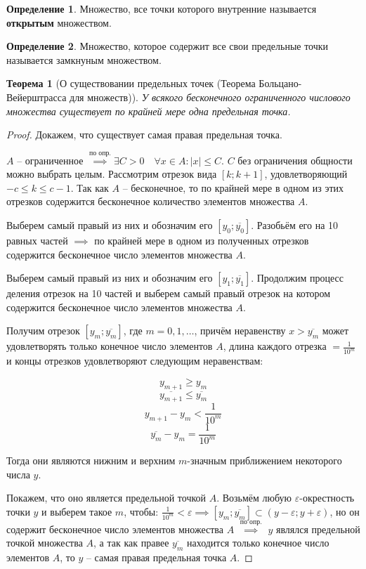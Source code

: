 \documentclass[a4paper,oneside]{article}
\newcommand{\bydef}{\stackrel{\text{по опр.}}{\implies}} %
\newtheorem{theorem}{Теорема}[subsection]
\theoremstyle{definition}
\newtheorem{definition}{Определение}[subsection]
\theoremstyle{definition}
\theoremstyle{definition}
\begin{document}
\begin{definition}
    Множество, все точки которого внутренние называется \textbf{открытым} множеством.    
\end{definition}

\begin{definition}
    Множество, которое содержит все свои предельные точки называется замкнуным множеством.    
\end{definition}

\begin{theorem}[О существовании предельных точек (Теорема Больцано-Вейерштрасса для множеств)]
    У всякого бесконечного ограниченного числового множества существует по крайней мере
    одна предельная точка.    
\end{theorem}

\begin{proof}
    Докажем, что существует самая правая предельная точка.

    $A$ -- ограниченное $\bydef \exists C > 0 \quad
    \forall x \in A: |x| \le C$.
    $C$ без ограничения общности можно выбрать целым.
    Рассмотрим отрезок вида $[k;k+1]$, удовлетворяющий $-c \le k \le c - 1$.
    Так как $A$ -- бесконечное, то по крайней мере в одном из этих отрезков содержится
    бесконечное количество элементов множества $A$.
    
    Выберем самый правый из них и обозначим его $[y_0;\overline{y_0}]$.
    Разобьём его на 10 равных частей $\implies$ по крайней мере в одном из
    полученных отрезков содержится бесконечное число элементов множества $A$.
    
    Выберем самый правый из них и обозначим его $[y_1;\overline{y_1}]$.
    Продолжим процесс деления отрезок на 10 частей и выберем самый правый отрезок
    на котором содержится бесконечное число элементов множества $A$.
    
    Получим отрезок $[y_m;\overline{y_m}]$, где $m = 0,1,\dots$, причём неравенству
    $x > \overline{y_m}$ может удовлетворять только конечное число элементов $A$,
    длина каждого отрезка $= \frac{1}{10^m}$ и концы отрезков удовлетворяют
    следующим неравенствам:
    
    \[y_{m+1} \ge y_m\]
    \[\overline{y_{m+1}} \le \overline{y_m}\]
    \[y_{m+1} - y_m < \frac{1}{10^m}\]
    \[\overline{y_m} - y_m = \frac{1}{10^m}\]
    
    Тогда они являются нижним и верхним $m$-значным приближением некоторого числа $y$.
    
    Покажем, что оно является предельной точкой $A$. Возьмём любую $\varepsilon$-окрестность
    точки $y$ и выберем такое $m$, чтобы: 
    $\frac{1}{10^m} < \varepsilon \implies [y_m;\overline{y_m}] \subset 
    (y - \varepsilon; y + \varepsilon)$, но он содержит бесконечное число элементов
    множества $A$ $\bydef$ $y$ являлся предельной точкой
    множества $A$, а так как правее $\overline{y_m}$ находится только конечное число
    элементов $A$, то $y$ -- самая правая предельная точка $A$.
\end{proof}
\end{document}
